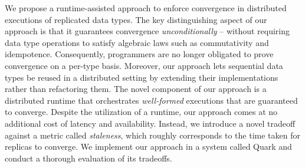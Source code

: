 
We propose a runtime-assisted approach to enforce convergence in distributed executions of replicated data types. The key distinguishing aspect of our approach is that it guarantees convergence \emph{unconditionally} -- without requiring data type operations to satisfy algebraic laws such as commutativity and idempotence. Consequently, programmers are no longer obligated to prove convergence on a per-type basis. Moreover, our approach lets sequential data types be reused in a distributed setting by extending their implementations rather than refactoring them.  The novel component of our approach is a distributed runtime that orchestrates \emph{well-formed } executions that are guaranteed to converge. Despite the utilization of a runtime, our approach comes at no additional cost of latency and availability. Instead, we introduce a novel tradeoff against a metric called \emph{staleness}, which roughly corresponds to the time taken for replicas to converge. We implement our approach in a system called Quark and conduct a thorough evaluation of its tradeoffs.
